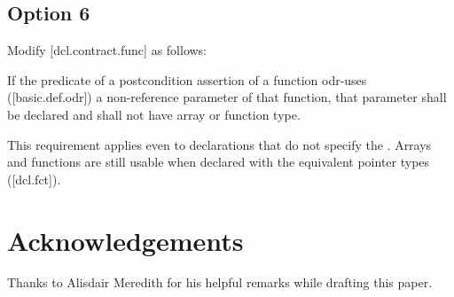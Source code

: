 \subsection{Option 6}

Modify [dcl.contract.func] as follows:

\begin{adjustwidth}{0.5cm}{0.5cm}
If the predicate of a postcondition assertion of a function odr-uses ([basic.def.odr]) a
non-reference parameter of that function, that parameter shall be declared  and shall not have array or function type.
\begin{note}
This requirement applies even to declarations
that do not specify the . Arrays and functions are still usable when declared with the equivalent pointer types ([dcl.fct]).
\end{note}
\begin{example}
\tcode{[...]}
\end{example}

\end{adjustwidth}


\section*{Acknowledgements}
Thanks to Alisdair Meredith for his helpful remarks while drafting this paper.


\renewcommand{\addcontentsline}[3]{}%







